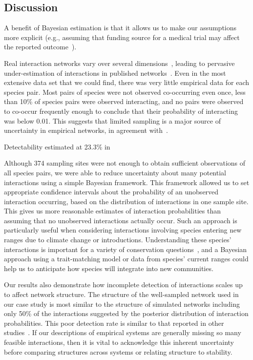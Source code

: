 \documentclass[12pt]{article}
\begin{document}
\begin{spacing}{2.0}

\section*{Discussion}

  A benefit of Bayesian estimation is that it allows us to make our assumptions more explicit (e.g., assuming that funding source for a medical trial may affect the reported outcome~\citep{Spiegelhalter2000}).


  Real interaction networks vary over several dimensions~\citep{Kitching1987,Olesen2011a,Pires2011a,Baiser2012,Fodrie2015,Novak2015}, leading to pervasive under-estimation of interactions in published networks~\citep{Jordano2016}. Even in the most extensive data set that we could find, there was very little empirical data for each species pair. Most pairs of species were not observed co-occurring even once, less than 10\% of species pairs were observed interacting, and no pairs were observed to co-occur frequently enough to conclude that their probability of interacting was below 0.01. This suggests that limited sampling is a major source of uncertainty in empirical networks, in agreement with~\citet{Jordano2016,Weinstein2017a,Weinstein2017}. 


  Detectability estimated at 23.3\% in~\citet{Weinstein2017a}

  Although 374 sampling sites were not enough to obtain sufficient observations of all species pairs, we were able to reduce uncertainty about many potential interactions using a simple Bayesian framework. This framework allowed us to set appropriate confidence intervals about the probability of an unobserved interaction occurring, based on the distribution of interactions in one sample site. This gives us more reasonable estimates of interaction probabilities than assuming that no unobserved interactions actually occur. Such an approach is particularly useful when considering interactions involving species entering new ranges due to climate change or introductions. Understanding these species' interactions is important for a variety of conservation questions~\citep{Bartomeus2013,Gravel2013}, and a Bayesian approach using a trait-matching model or data from species' current ranges could help us to anticipate how species will integrate into new communities. 


  Our results also demonstrate how incomplete detection of interactions scales up to affect network structure. The structure of the well-sampled network used in our case study is most similar to the structure of simulated networks including only 50\% of the interactions suggested by the posterior distribution of interaction probabilities. This poor detection rate is similar to that reported in other studies~\citep{Bartomeus2013,Jordano2016,Weinstein2017a}. If our descriptions of empirical systems are generally missing so many feasible interactions, then it is vital to acknowledge this inherent uncertainty before comparing structures across systems or relating structure to stability.



\end{spacing}
\end{document}
